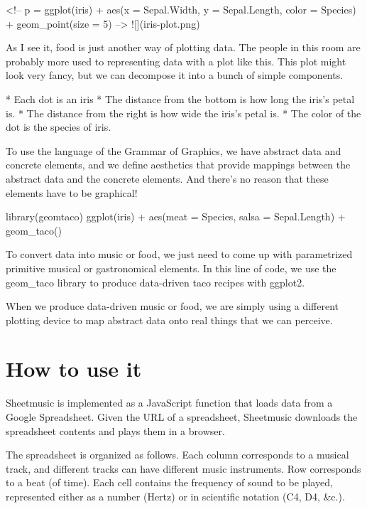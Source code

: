 \documentclass{acm_proc_article-sp}
\begin{document}
<!--
p = ggplot(iris) + aes(x = Sepal.Width, y = Sepal.Length, color = Species) + geom_point(size = 5)                   
-->
![](iris-plot.png)

As I see it, food is just another way of plotting data. The people
in this room are probably more used to representing data with a plot like this.
This plot
might look very fancy, but we can decompose it into a bunch of simple
components.

* Each dot is an iris
* The distance from the bottom is how long the iris's petal is.
* The distance from the right is how wide the iris's petal is.
* The color of the dot is the species of iris.

To use the language of the Grammar of Graphics, we have abstract data
and concrete elements, and we define aesthetics that provide mappings
between the abstract data and the concrete elements.
And there's no reason that these elements have to be graphical!

    library(geomtaco)
    ggplot(iris) + aes(meat = Species, salsa = Sepal.Length) + geom_taco()

To convert
data into music or food, we just need to come up with parametrized primitive
musical or gastronomical elements. In this line of code, we use the geom\_taco
library to produce data-driven taco recipes with ggplot2.

When we produce data-driven music or food,
we are simply using a different plotting device to map abstract data
onto real things that we can perceive.









\section{How to use it}
Sheetmusic is implemented as a JavaScript function that loads data
from a Google Spreadsheet. Given the URL of a spreadsheet, Sheetmusic
downloads the spreadsheet contents and plays them in a browser.

The spreadsheet is organized as follows. Each column corresponds
to a musical track, and different tracks can have different music instruments.
Row corresponds to a beat (of time).
Each cell contains the frequency of sound to be played, represented
either as a number (Hertz) or in scientific notation (C4, D4, \&c.).
\end{document}
